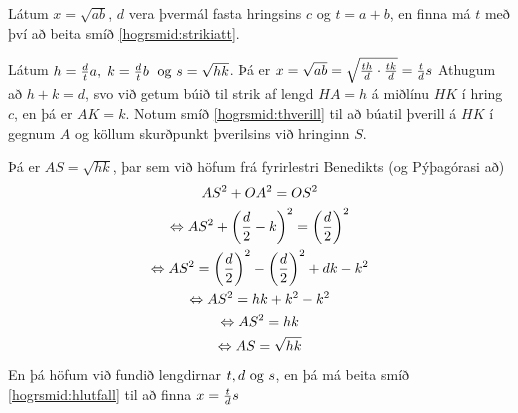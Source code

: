 \begin{frame}[allowframebreaks]
  \begin{hogrsmid}\label{hogrsmid:kvadratrot}
    Látum \(x = \sqrt{ab}\), \(d\) vera þvermál fasta hringsins \(c\) og \(t = a+b\),
    en finna má \(t\) með því að beita smíð \ref{hogrsmid:strikiatt}.

    Látum \(h =\frac{d}{t}a, \; k = \frac{d}{t}b \; \text{ og } s = \sqrt{hk}\).
    Þá er \(x = \sqrt{ab} = \sqrt{\frac{th}{d} \cdot \frac{tk}{d}} = \frac{t}{d}s\)
    Athugum að \(h+k = d\), svo við getum búið til strik af lengd
    \(HA = h\) á miðlínu \(HK\) í hring \(c\), en þá er \(AK = k\).
    Notum smíð \ref{hogrsmid:thverill} til að búatil þverill á \(HK\) í
    gegnum \(A\) og köllum skurðpunkt þverilsins við hringinn \(S\).
    
    \theorembreak
    Þá er \(AS = \sqrt{hk}\), þar sem við höfum frá fyrirlestri Benedikts
    (og Pýþagórasi að)
    \begin{gather*}
      AS^2 + OA^2 = OS^2\\
      \Leftrightarrow AS^2 + \left(\frac{d}{2} - k \right)^2 = \left(\frac{d}{2} \right)^2\\
    \Leftrightarrow AS^2 = \left( \frac{d}{2} \right)^2 - \left( \frac{d}{2} \right)^2 + dk - k^2 \\
    \Leftrightarrow AS^2 = hk + k^2 - k^2\\
    \Leftrightarrow AS^2 = hk\\
    \Leftrightarrow AS = \sqrt{hk}
  \end{gather*}
  En þá höfum við fundið lengdirnar \(t, d \text{ og } s\), en þá má beita
  smíð \ref{hogrsmid:hlutfall} til að finna \(x = \frac{t}{d}s\)
  \end{hogrsmid}
\end{frame}

